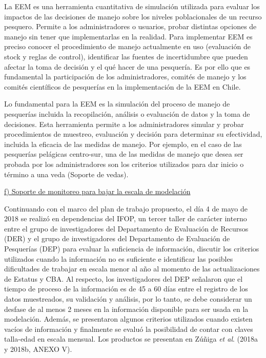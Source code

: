 \documentclass[
  spanish,
]{article}
\begin{document}
La EEM es una herramienta cuantitativa de simulación utilizada para
evaluar los impactos de las decisiones de manejo sobre los niveles
poblacionales de un recurso pesquero. Permite a los administradores o
usuarios, probar distintas opciones de manejo sin tener que
implementarlas en la realidad. Para implementar EEM es preciso conocer
el procedimiento de manejo actualmente en uso (evaluación de stock y
reglas de control), identificar las fuentes de incertidumbre que pueden
afectar la toma de decisión y el qué hacer de una pesquería. Es por ello
que es fundamental la participación de los administradores, comités de
manejo y los comités científicos de pesquerías en la implementación de
la EEM en Chile.

Lo fundamental para la EEM es la simulación del proceso de manejo de
pesquerías incluida la recopilación, análisis o evaluación de datos y la
toma de decisiones. Esta herramienta permite a los administradores
simular y probar procedimientos de muestreo, evaluación y decisión para
determinar su efectividad, incluida la eficacia de las medidas de
manejo. Por ejemplo, en el caso de las pesquerías pelágicas centro-sur,
una de las medidas de manejo que desea ser probada por los
administradores son los criterios utilizados para dar inicio o término a
una veda (Soporte de vedas).

\vspace{0.3cm}

\underline{f) Soporte de monitoreo para bajar la escala de modelación}

Continuando con el marco del plan de trabajo propuesto, el día 4 de mayo
de 2018 se realizó en dependencias del IFOP, un tercer taller de
carácter interno entre el grupo de investigadores del Departamento de
Evaluación de Recursos (DER) y el grupo de investigadores del
Departamento de Evaluación de Pesquerías (DEP) para evaluar la
suficiencia de información, discutir los criterios utilizados cuando la
información no es suficiente e identificar las posibles dificultades de
trabajar en escala menor al año al momento de las actualizaciones de
Estatus y CBA. Al respecto, los investigadores del DEP señalaron que el
tiempo de proceso de la información es de 45 a 60 días entre el registro
de los datos muestreados, su validación y análisis, por lo tanto, se
debe considerar un desfase de al menos 2 meses en la información
disponible para ser usada en la modelación. Además, se presentaron
algunos criterios utilizados cuando existen vacíos de información y
finalmente se evaluó la posibilidad de contar con claves talla-edad en
escala mensual. Los productos se presentan en Zúñiga \emph{et al}.
(2018a y 2018b, ANEXO V).
\end{document}
